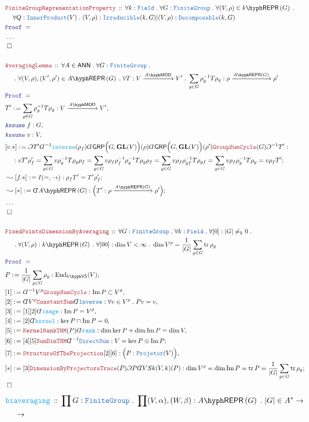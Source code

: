 \documentclass[12pt]{scrartcl}%
\newcommand{\TYPE}[1]{\textcolor{NavyBlue}{\mathtt{#1}}}%
\newcommand{\FUNC}[1]{\textcolor{Cerulean}{\mathtt{#1}}}%
\newcommand{\LOGIC}[1]{\textcolor{Blue}{\mathtt{#1}}}%
\newcommand{\THM}[1]{\textcolor{Maroon}{\mathtt{#1}}}%
\renewcommand{\.}{\; . \;} %
\newcommand{\de}{: \kern 0.1pc =} %
\newcommand{\Theorem}[2]{& \THM{#1} \, :: \, #2 \\ & \Proof = \\ } %
\newcommand{\DeclareFunc}[2]{& \FUNC{#1} \, :: \, #2 \\}%
\newcommand{\NewLine}{\\ & \kern 1pc}%
\newcommand{\Page}[1]{ \begin{align*} #1 \end{align*}  }%
\newcommand{ \bd }{ \ByDef }%
\newcommand{\NoProof}{ & \ldots \\ \EndProof}%
\DeclareMathOperator*{\im}{Im}%
\newcommand{\End}{\mathrm{End}}%
\newcommand{\Say}[3]{& #1 \de #2 : #3, \\} %
\newcommand{\Conclude}[3]{& #1 \de #2 : #3; \\}%
\newcommand{\DeriveConclude}[3]{& \leadsto #1 \de #2 : #3 ; \\} %
\newcommand{\Assume}[2]{& \LOGIC{Assume} \; #1 : #2, \\} %
\newcommand{\QED}{\; \square} %
\newcommand{\EndProof}{& \QED \\} %
\newcommand{\ByDef}{\rotatebox[origin=c]{-180}{$D$}}%
\newcommand{\ByConstr}{\rotatebox[origin=c]{-180}{$C$}}%
\newcommand{\Proof}{\LOGIC{Proof} \; } %
\newcommand{\Arrow}[1]{\xrightarrow{#1}}%
\newcommand{\FG}{\TYPE{FiniteGroup}} %
\newcommand{\GRP}{\mathsf{GRP}} %
\newcommand{\REPR}[2]{#1\hyph\mathsf{REPR}\left(#2\right)}
\newcommand{\GL}{\mathbf{GL}}%
\DeclareMathOperator{\tr}{tr}     %
\newcommand{\VS}[1]{#1\hyph\mathsf{VS}} %
\newcommand{\LMOD}[1]{#1\hyph\mathsf{MOD}} %
\newcommand{\Field}{\TYPE{Field}}
\newcommand{\ANN}{\mathsf{ANN}} %
\begin{document}
\Page{
	\Theorem{FiniteGroupRepresentationProperty}
	{
		\forall k : \Field \.
		\forall G : \FG \.
		\forall (V,\rho) \in \REPR{k}{G} \. \NewLine  
		\forall Q : \TYPE{InnerProduct}(V) \.
		(V,\rho) : \TYPE{Irreducible}(k,G) |
		(V,\rho) : \TYPE{Decomposable}(k,G)
	}
	\NoProof
	\\
	\Theorem{AveragingLemma}
	{
		\forall A \in \ANN \.
		\forall G : \FG \.
		 \NewLine \. 
		\forall (V,\rho),(V',\rho') \in \REPR{A}{G} \.  
		\forall T : V \Arrow{\LMOD{A}} V' \.
		\sum_{g \in G} \rho^{-1}_g T \rho_g : 
		\rho \Arrow{\REPR{A}{G}} \rho'
	}
	\Say{T'}{\sum_{g \in G} \rho^{-1}_g T \rho_g}{V \Arrow{\LMOD{A}} V'}
	\Assume{f}{G}
	\Assume{v}{V}
	\Conclude{[v.*]}
	{
		\ByConstr T'
		\bd^{-1} \FUNC{inverse} (\rho_f)
		\bd \GRP\Big(G,\GL(V)\Big)(\rho)
		\bd \GRP\Big(G,\GL(V)\Big)(\rho')
		\THM{GroupSumCycle}(G)
		\ByConstr^{-1} T'
	}
	{  
		\NewLine :
		v T' \rho'_f = 
		\sum_{g \in G} v\rho^{-1}_g T \rho_g\rho_f = 
		\sum_{g \in G} v \rho_f \rho^{-1}_f\rho_g^{-1} T \rho_g\rho_f
		= 
		\sum_{g \in G} v \rho_f \rho^{-1}_{gf} T \rho_{gf} =
		\sum_{g \in G} v \rho_f \rho^{-1}_{g} T \rho_{g} =
		v \rho_f T'
	}
	\DeriveConclude{[f.*]}{I(=,\to)}{\rho_f T' = T' \rho'_f}
	\DeriveConclude{[*]}{\bd \REPR{A}{G}}
	{ \Big( T' : \rho \Arrow{\REPR{A}{G}} \rho' \Big)  }
	\NoProof 
	\\
	\Theorem{FixedPointsDimensionByAveraging}
	{
		\forall G : \FG \.
		\forall k : \Field \.
		\forall [0] :|G| \neq_k 0 \. \NewLine \. 
		\forall (V,\rho) : \REPR{k}{G} \. 
		\forall [00] : \dim V < \infty \. 
		\dim V^\rho = \frac{1}{|G|}\sum_{g \in G} \tr \rho_g
	}
	\Say{P}{\frac{1}{|G|} \sum_{g \in G} \rho_g}
	{ \End_{\VS{k}}(V) }
	\Say{[1]}{
		\bd^{-1} V^\rho \THM{GroupSumCycle}
	}{ \im P \subset V^\rho }
	\Say{[2]}{\bd V^\rho \THM{ConstantSum} \bd \TYPE{Inverse}}
	{
	   \forall v \in V^\rho \. Pv = v
	}
	\Say{[3]}{[1][2] \bd \FUNC{image}}
	{	
		\im P = V^\rho
	} 
	\Say{[4]}{  [2]\bd \FUNC{kernel} }
	{  \ker P \cap \im P = 0   }
	\Say{[5]}{\THM{KernelRankTHM}(P)\bd \FUNC{rank}}
	{
		\dim \ker P + \dim \im P = \dim V
	}
	\Conclude{[6]}{[4][5]\THM{SumDimTHM}\bd^{-1}\TYPE{DirectSum}}
	{
		V = \ker P \oplus \im P
	}
	\Say{[7]}{\THM{StructureOfTheProjection}[2][6]}
	{
		\Big(
			P : \TYPE{Projetor}(V) 
		\Big) 
	}
	\Conclude{[*]}{
		[3]
		\THM{DimensionByProjectorsTrace}(P)
		\ByConstr P
		\bd VS{k}(V,k)(P)
	}
	{
		\dim V^\rho =
		\dim \im P =
		\tr P =  
		\frac{1}{|G|} \sum_{g \in G} \tr \rho_g
	}
	\EndProof
}\Page{
	\DeclareFunc{biaveraging}
	{
		\prod G : \FG \.
		\prod (V,\alpha),(W,\beta) : \REPR{A}{G} \.
		|G| \in A^* \to \NewLine \to 
}}
\end{document}
